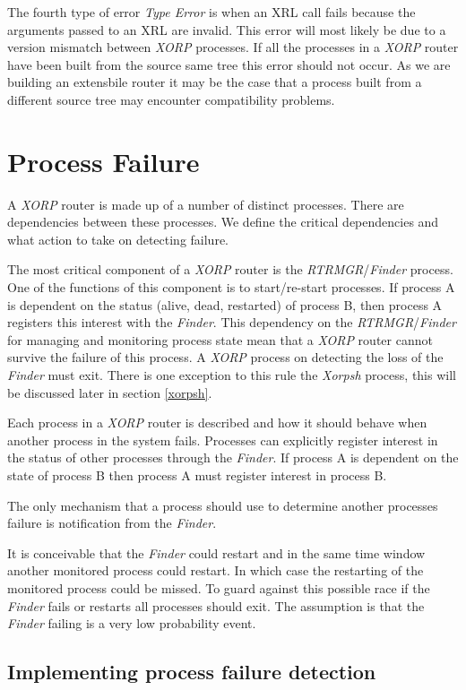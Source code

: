 \documentclass[11pt]{article}
\makeatletter
\newcommand{\xorp} {{\em XORP}\@\xspace}
\newcommand{\finder} {{\em Finder}\@\xspace}
\newcommand{\xorpsh} {{\em Xorpsh}\@\xspace}
\newcommand{\rtrmgr} {{\em RTRMGR}\@\xspace}
\makeatother
\begin{document}
The fourth type of error {\em Type Error} is when an XRL call fails
because the arguments passed to an XRL are invalid. This error will
most likely be due to a version mismatch between \xorp processes. If
all the processes in a \xorp router have been built from the source
same tree this error should not occur. As we are building an
extensbile router it may be the case that a process built from a
different source tree may encounter compatibility problems.

\section{\label{pfailure}Process Failure}

A \xorp router is made up of a number of distinct processes. There are
dependencies between these processes. We define the critical
dependencies and what action to take on detecting failure.

The most critical component of a \xorp router is the \rtrmgr/\finder
process. One of the functions of this component is to start/re-start
processes. If process A is dependent on the status (alive, dead,
restarted) of process B, then process A registers this interest with
the \finder. This dependency on the \rtrmgr/\finder for managing and
monitoring process state mean that a \xorp router cannot survive the
failure of this process. A \xorp process on detecting the loss of the
\finder must exit. There is one exception to this rule the \xorpsh
process, this will be discussed later in section \ref{xorpsh}.

Each process in a \xorp router is described and how it should behave
when another process in the system fails. Processes can explicitly
register interest in the status of other processes through the
\finder. If process A is dependent on the state of process B then
process A must register interest in process B.

The only mechanism that a process should use to determine another
processes failure is notification from the \finder.

It is conceivable that the \finder could restart and in the same time
window another monitored process could restart. In which case the
restarting of the monitored process could be missed. To guard against
this possible race if the \finder fails or restarts all processes
should exit. The assumption is that the \finder failing is a very low
probability event.

\subsection{Implementing process failure detection}
\end{document}
